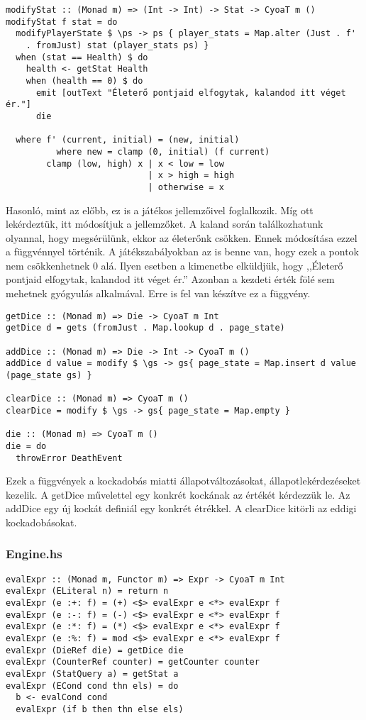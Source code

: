 \documentclass[12pt,a4paper,oneside]{report}
\begin{document}
    \begin{verbatim}
modifyStat :: (Monad m) => (Int -> Int) -> Stat -> CyoaT m ()
modifyStat f stat = do
  modifyPlayerState $ \ps -> ps { player_stats = Map.alter (Just . f'
    . fromJust) stat (player_stats ps) }
  when (stat == Health) $ do
    health <- getStat Health
    when (health == 0) $ do
      emit [outText "Életerő pontjaid elfogytak, kalandod itt véget ér."]
      die

  where f' (current, initial) = (new, initial)
          where new = clamp (0, initial) (f current)
        clamp (low, high) x | x < low = low
                            | x > high = high
                            | otherwise = x
    \end{verbatim}
    Hasonló, mint az előbb, ez is a játékos jellemzőivel
    foglalkozik. Míg ott lekérdeztük, itt módosítjuk a jellemzőket. A
    kaland során találkozhatunk olyannal, hogy megsérülünk, ekkor az
    életerőnk csökken. Ennek módosítása ezzel a függvénnyel
    történik. A játékszabályokban az is benne van, hogy ezek a pontok
    nem csökkenhetnek 0 alá. Ilyen esetben a kimenetbe elküldjük, hogy
    ,,Életerő pontjaid elfogytak, kalandod itt véget ér.'' Azonban a
    kezdeti érték fölé sem mehetnek gyógyulás alkalmával. Erre is fel
    van készítve ez a függvény.

    \begin{verbatim}
getDice :: (Monad m) => Die -> CyoaT m Int
getDice d = gets (fromJust . Map.lookup d . page_state)

addDice :: (Monad m) => Die -> Int -> CyoaT m ()
addDice d value = modify $ \gs -> gs{ page_state = Map.insert d value (page_state gs) }

clearDice :: (Monad m) => CyoaT m ()
clearDice = modify $ \gs -> gs{ page_state = Map.empty }

die :: (Monad m) => CyoaT m ()
die = do
  throwError DeathEvent
  \end{verbatim}

    Ezek a függvények a kockadobás miatti állapotváltozásokat,
    állapotlekérdezéseket kezelik. A getDice művelettel egy konkrét
    kockának az értékét kérdezzük le. Az addDice egy új kockát
    definiál egy konkrét étrékkel. A clearDice kitörli az eddigi kockadobásokat.

      \subsubsection{Engine.hs}
      \begin{verbatim}
evalExpr :: (Monad m, Functor m) => Expr -> CyoaT m Int
evalExpr (ELiteral n) = return n
evalExpr (e :+: f) = (+) <$> evalExpr e <*> evalExpr f
evalExpr (e :-: f) = (-) <$> evalExpr e <*> evalExpr f
evalExpr (e :*: f) = (*) <$> evalExpr e <*> evalExpr f
evalExpr (e :%: f) = mod <$> evalExpr e <*> evalExpr f
evalExpr (DieRef die) = getDice die
evalExpr (CounterRef counter) = getCounter counter
evalExpr (StatQuery a) = getStat a
evalExpr (ECond cond thn els) = do
  b <- evalCond cond
  evalExpr (if b then thn else els)
      \end{verbatim}
\end{document}
